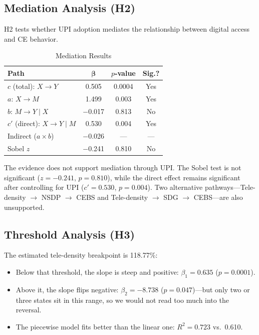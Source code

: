 \documentclass[conference]{IEEEtran}
\begin{document}
\subsection{Mediation Analysis (H2)}

H2 tests whether UPI adoption mediates the relationship between digital access and CE behavior.

\begin{table}[!t]
\centering
\caption{Mediation Results}
\label{tab:mediation}
\renewcommand{\arraystretch}{1.15}
\begin{tabular}{@{}p{2.8cm}ccc@{}}
\toprule
\textbf{Path} & $\boldsymbol{\beta}$ & \textbf{$p$-value} & \textbf{Sig.?} \\
\midrule
$c$ (total): $X \rightarrow Y$      & 0.505 & 0.0004 & Yes \\
$a$: $X \rightarrow M$              & 1.499 & 0.003  & Yes \\
$b$: $M \rightarrow Y \mid X$       & $-$0.017 & 0.813 & No \\
$c'$ (direct): $X \rightarrow Y \mid M$ & 0.530 & 0.004 & Yes \\
Indirect ($a \times b$)             & $-$0.026 & --- & --- \\
Sobel $z$                           & $-$0.241 & 0.810 & No \\
\bottomrule
\end{tabular}
\end{table}

The evidence does not support mediation through UPI. The Sobel test is not significant ($z = -0.241$, $p = 0.810$), while the direct effect remains significant after controlling for UPI ($c' = 0.530$, $p = 0.004$). Two alternative pathways---Tele-density $\rightarrow$ NSDP $\rightarrow$ CEBS and Tele-density $\rightarrow$ SDG $\rightarrow$ CEBS---are also unsupported.

\subsection{Threshold Analysis (H3)}

The estimated tele-density breakpoint is 118.77\%:

\begin{itemize}
    \item Below that threshold, the slope is steep and positive: $\beta_1 = 0.635$ ($p = 0.0001$).
    \item Above it, the slope flips negative: $\beta_2 = -8.738$ ($p = 0.047$)---but only two or three states sit in this range, so we would not read too much into the reversal.
    \item The piecewise model fits better than the linear one: $R^2 = 0.723$ vs.\ 0.610.
\end{itemize}
\end{document}
